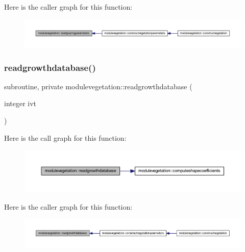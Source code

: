 Here is the caller graph for this function\+:\nopagebreak
\begin{figure}[H]
\begin{center}
\leavevmode
\includegraphics[width=350pt]{namespacemodulevegetation_ac0d2b1971374eb7a2ded39cf56b0bd04_icgraph}
\end{center}
\end{figure}
\mbox{\label{namespacemodulevegetation_a0354ed5206e5b8c4f1269740f6b6506d}} 
\subsubsection{\texorpdfstring{readgrowthdatabase()}{readgrowthdatabase()}}
{\footnotesize\ttfamily subroutine, private modulevegetation\+::readgrowthdatabase (\begin{DoxyParamCaption}\item[{integer}]{ivt }\end{DoxyParamCaption})\hspace{0.3cm}{\ttfamily [private]}}

Here is the call graph for this function\+:\nopagebreak
\begin{figure}[H]
\begin{center}
\leavevmode
\includegraphics[width=350pt]{namespacemodulevegetation_a0354ed5206e5b8c4f1269740f6b6506d_cgraph}
\end{center}
\end{figure}
Here is the caller graph for this function\+:\nopagebreak
\begin{figure}[H]
\begin{center}
\leavevmode
\includegraphics[width=350pt]{namespacemodulevegetation_a0354ed5206e5b8c4f1269740f6b6506d_icgraph}
\end{center}
\end{figure}
\mbox{\label{namespacemodulevegetation_aec7d28b5d51b61d5ccc514ba6a645846}} 
